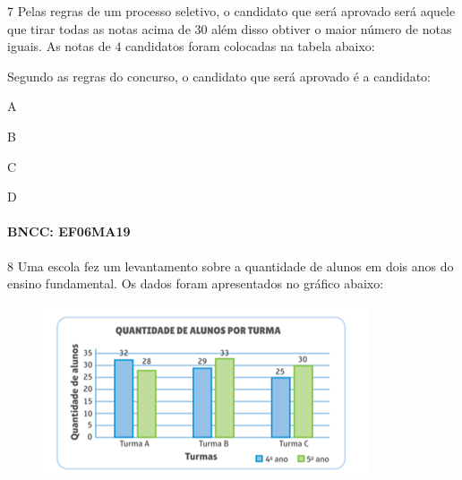 {\num{7}  Pelas regras de um processo seletivo, o candidato que será aprovado
será aquele que tirar todas as notas acima de $30$ além disso obtiver o
maior número de notas iguais. As notas de $4$ candidatos foram colocadas
na tabela abaixo:


Segundo as regras do concurso, o candidato que será aprovado é a
candidato:

\begin{escolha}
\item A
\item B
\item C
\item D
\end{escolha}

\paragraph{BNCC: EF06MA19 }


\num{8} Uma escola fez um levantamento sobre a quantidade de alunos em dois
anos do ensino fundamental. Os dados foram apresentados no gráfico
abaixo:

\begin{figure}
\includegraphics[width=3.78125in,height=1.94792in]{./imgSAEB_6_MAT/media/image110.png}
\end{figure}

}
